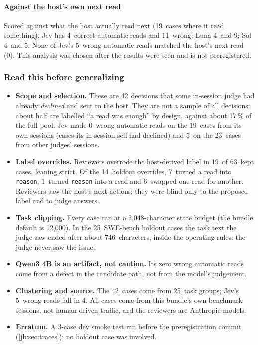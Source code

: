 \documentclass[11pt,letterpaper]{article}
\newcommand{\code}[1]{\texttt{#1}}
\newcommand{\TrGroups}{25}
\newcommand{\TrHoldOverrides}{14}
\newcommand{\TrHostReadCases}{19}
\newcommand{\TrJevHostReads}{4}
\newcommand{\TrJevHostWa}{11}
\newcommand{\TrJevOtherN}{23}
\newcommand{\TrJevOtherWa}{5}
\newcommand{\TrJevOwnN}{19}
\newcommand{\TrJevOwnWa}{0}
\newcommand{\TrJevWaK}{5}
\newcommand{\TrJevWaMatchHost}{0}
\newcommand{\TrJevWrongGroups}{4}
\newcommand{\TrKept}{63}
\newcommand{\TrLunaHostReads}{4}
\newcommand{\TrLunaHostWa}{9}
\newcommand{\TrN}{42}
\newcommand{\TrOverReadToRead}{6}
\newcommand{\TrOverReadToReason}{7}
\newcommand{\TrOverReasonToRead}{1}
\newcommand{\TrOverridden}{19}
\newcommand{\TrPoolReadPct}{17}
\newcommand{\TrSThree}{25}
\newcommand{\TrSmokeCases}{3}
\newcommand{\TrSolHostReads}{4}
\newcommand{\TrSolHostWa}{5}
\newcommand{\TrStateBudget}{2{,}048}
\newcommand{\TrStateDefault}{12{,}000}
\newcommand{\TrTaskSeen}{746}
\begin{document}
\paragraph{Against the host's own next read} Scored against what the host actually read next (\TrHostReadCases\
cases where it read something), Jev has \TrJevHostReads\ correct automatic reads and \TrJevHostWa\ wrong;
Luna \TrLunaHostReads\ and \TrLunaHostWa; Sol \TrSolHostReads\ and \TrSolHostWa. None of Jev's \TrJevWaK\
wrong automatic reads matched the host's next read (\TrJevWaMatchHost). This analysis was chosen after the
results were seen and is not preregistered.

\subsubsection{Read this before generalizing}\label{jb:sec:caveats}

\begin{caution}[title={Read this before generalizing}]
\begin{itemize}[leftmargin=1.1em]
  \item \textbf{Scope and selection.} These are \TrN\ decisions that some in-session judge had already
    \emph{declined} and sent to the host. They are not a sample of all decisions: about half are labelled
    ``a read was enough'' by design, against about \TrPoolReadPct\,\% of the full pool. Jev made
    \TrJevOwnWa\ wrong automatic reads on the \TrJevOwnN\ cases from its own sessions (cases its
    in-session self had declined) and \TrJevOtherWa\ on the \TrJevOtherN\ cases from other judges'
    sessions.
  \item \textbf{Label overrides.} Reviewers overrode the host-derived label in \TrOverridden\ of
    \TrKept\ kept cases, leaning strict. Of the \TrHoldOverrides\ holdout overrides, \TrOverReadToReason\
    turned a read into \code{reason}, \TrOverReasonToRead\ turned \code{reason} into a read and
    \TrOverReadToRead\ swapped one read for another. Reviewers saw the host's next actions; they were blind
    only to the proposed label and to judge answers.
  \item \textbf{Task clipping.} Every case ran at a \TrStateBudget-character state budget (the bundle
    default is \TrStateDefault). In the \TrSThree\ SWE-bench holdout cases the task text the judge saw ended
    after about \TrTaskSeen\ characters, inside the operating rules: the judge never saw the issue.
  \item \textbf{Qwen3 4B is an artifact, not caution.} Its zero wrong automatic reads come from a defect
    in the candidate path, not from the model's judgement.
  \item \textbf{Clustering and source.} The \TrN\ cases come from \TrGroups\ task groups; Jev's
    \TrJevWaK\ wrong reads fall in \TrJevWrongGroups. All cases come from this bundle's own benchmark
    sessions, not human-driven traffic, and the reviewers are Anthropic models.
  \item \textbf{Erratum.} A \TrSmokeCases-case dev smoke test ran before the preregistration commit
    (\cref{jb:sec:traces}); no holdout case was involved.
\end{itemize}
\end{caution}
\end{document}

